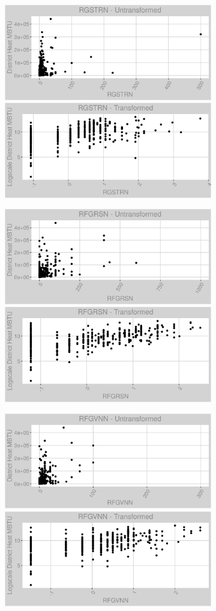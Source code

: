 \FloatBarrier
\newpage
\begin{figure}
\centering
\begin{subfigure}{1\textwidth}
\centering
\includegraphics[width=.49\textwidth, height=0.3\textheight]{Images/district_heat_var_original_6.png}
\includegraphics[width=.49\textwidth, height=0.3\textheight]{Images/district_heat_var_transformed_6.png}
\end{subfigure}
\begin{subfigure}{1\textwidth}
\centering
\includegraphics[width=.49\textwidth, height=0.3\textheight]{Images/district_heat_var_original_7.png}
\includegraphics[width=.49\textwidth, height=0.3\textheight]{Images/district_heat_var_transformed_7.png}
\end{subfigure}
\begin{subfigure}{1\textwidth}
\centering
\includegraphics[width=.49\textwidth, height=0.3\textheight]{Images/district_heat_var_original_8.png}
\includegraphics[width=.49\textwidth, height=0.3\textheight]{Images/district_heat_var_transformed_8.png}
\end{subfigure}
\end{figure}
